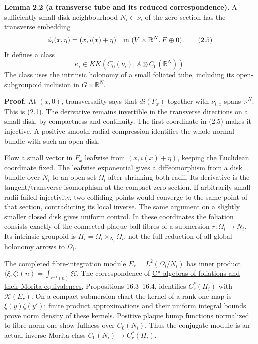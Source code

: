 \documentclass[
  11pt,
]{article}
\begin{document}
\textbf{Lemma 2.2 (a transverse tube and its reduced correspondence).} A
sufficiently small disk neighbourhood \(N_i\subset\nu_i\) of the zero
section has the transverse embedding \[
 \phi_i(x,\eta)=(x,i(x)+\eta)
 \quad\hbox{in }(V\times\mathbb R^N,F\oplus0).
 \tag{2.5}
\] It defines a class \[
 \kappa_i\in KK(C_0(\nu_i),A\otimes C_0(\mathbb R^N)).
 \tag{2.6}
\] The class uses the intrinsic holonomy of a small foliated tube,
including its open-subgroupoid inclusion in \(G\times\mathbb R^N\).

\textbf{Proof.} At \((x,0)\), transversality says that \(di(F_x)\)
together with \(\nu_{i,x}\) spans \(\mathbb R^N\). This is (2.1). The
derivative remains invertible in the transverse directions on a small
disk, by compactness and continuity. The first coordinate in (2.5) makes
it injective. A positive smooth radial compression identifies the whole
normal bundle with such an open disk.

Flow a small vector in \(F_x\) leafwise from \((x,i(x)+\eta)\), keeping
the Euclidean coordinate fixed. The leafwise exponential gives a
diffeomorphism from a disk bundle over \(N_i\) to an open set
\(\Omega_i\) after shrinking both radii. Its derivative is the
tangent/transverse isomorphism at the compact zero section. If
arbitrarily small radii failed injectivity, two colliding points would
converge to the same point of that section, contradicting its local
inverse. The same argument on a slightly smaller closed disk gives
uniform control. In these coordinates the foliation consists exactly of
the connected plaque-ball fibres of a submersion \(r:\Omega_i\to N_i\).
Its intrinsic groupoid is \(H_i=\Omega_i\times_{N_i}\Omega_i\), not the
full reduction of all global holonomy arrows to \(\Omega_i\).

The completed fibre-integration module \(E_r=L^2(\Omega_i/N_i)\) has
inner product
\(\langle\xi,\zeta\rangle(n)=\int_{r^{-1}(n)}\overline\xi\zeta\). The
correspondence of \href{../KT-CP/KT-CP-16.html}{C*-algebras of
foliations and their Morita equivalences}, Propositions 16.3--16.4,
identifies \(C_r^*(H_i)\) with \(\mathcal K(E_r)\). On a compact
submersion chart the kernel of a rank-one map is
\(\xi(y)\overline{\zeta(y')}\); finite product approximations and their
uniform integral bounds prove norm density of these kernels. Positive
plaque bump functions normalized to fibre norm one show fullness over
\(C_0(N_i)\). Thus the conjugate module is an actual inverse Morita
class \(C_0(N_i)\to C_r^*(H_i)\).
\end{document}
